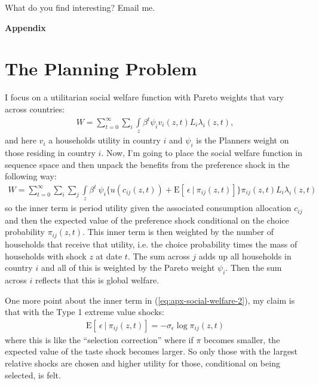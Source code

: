 \documentclass[12pt,pdftex]{article}
\begin{document}
\begin{onehalfspacing}
 What do you find interesting? Email me.



\appendix

\clearpage
\newpage

\begin{center}
\textbf{\Large Appendix}
\end{center}


\section{The Planning Problem}\label{sec:apx-planner}

I focus on a utilitarian social welfare function with Pareto weights that vary across countries:
\begin{align}
W = \sum_{t=0}^{\infty} \sum_{i}  \int\limits_{z} \beta^{t} \psi_{i} v_{i}(z,t) L_{i}\lambda_{i}(z,t),
\label{eq:apx-social-welfare}
\end{align}
and here $v_i$ a households utility in country $i$ and $\psi_{i}$ is the Planners weight on those residing in country $i$. Now, I'm going to place the social welfare function in sequence space and then unpack the benefits from the preference shock in the following way:
\begin{align}
W = \sum_{t=0}^{\infty}  \sum_{i}  \sum_{j}  \int\limits_{z}  \beta^{t} \  \psi_{i} \bigg \{  u(c_{ij}(z, t) ) + \mathrm{E}[ \ \epsilon \ | \ \pi_{ij}(z,t) ] \bigg \}\pi_{ij}(z,t) L_{i} \lambda_{i}(z, t)
\label{eq:apx-social-welfare-2}
\end{align}
so the inner term is period utility given the associated consumption allocation $c_{ij}$ and then the expected value of the preference shock conditional on the choice probability $\pi_{ij}(z,t)$. This inner term is then weighted by the number of households that receive that utility, i.e. the choice probability times the mass of households with shock $z$ at date $t$. The sum across $j$ adds up all households in country $i$ and all of this is weighted by the Pareto weight $\psi_{i}$. Then the sum across $i$ reflects that this is global welfare.

One more point about the inner term in (\ref{eq:apx-social-welfare-2}), my claim is that with the Type 1 extreme value shocks:
\begin{align}
\mathrm{E}[ \ \epsilon \ | \ \pi_{ij}(z,t) ] = -\sigma_{\epsilon} \log \pi_{ij}(z,t)
\end{align}
where this is like the ``selection correction'' where if $\pi$ becomes smaller, the expected value of the taste shock becomes larger. So only those with the largest relative shocks are chosen and higher utility for those, conditional on being selected, is felt.


\end{onehalfspacing}
\end{document}
